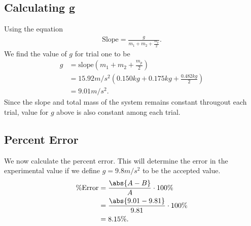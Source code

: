 \documentclass{report}
\begin{document}
    \subsection{Calculating g}
    \bigbreak \noindent 
    Using the equation
    \begin{align*}
        \text{Slope} = \frac{g}{m_{1} + m_{2} + \frac{m_{p}}{2}}
    .\end{align*}
    We find the value of $g$ for trial one to be
    \begin{align*}
        g &= \text{slope}\left(m_{1} + m_{2} + \frac{m_{p}}{2}\right) \\
        &=15.92m/s^{2}\left(0.150kg + 0.175kg+\frac{0.482kg}{2}\right) \\
        &=9.01m/s^{2}
    .\end{align*}
    \bigbreak \noindent 
    Since the slope and total mass of the system remains constant througout each trial, value for $g$ above is also constant among each trial.

    \bigbreak \noindent 
    \subsection{Percent Error}
    \bigbreak \noindent 
    We now calculate the percent error. This will determine the error in the experimental value if we define $g=9.8 m/s^{2}$ to be the accepted value.
    \begin{align*}
    \text{\%Error} &= \frac{\abs{A-B}}{A} \cdot 100\% \\
                      &=\frac{\abs{9.01 - 9.81}}{9.81} \cdot 100 \%  \\
                      &=8.15\%
    .\end{align*}

    \bigbreak \noindent 
\end{document}
